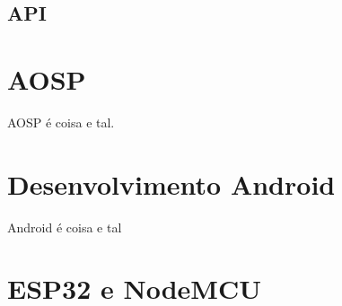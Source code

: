 \subsection{API}


\section{AOSP}

AOSP é coisa e tal.

\section{Desenvolvimento Android}

Android é coisa e tal 

\section{ESP32 e NodeMCU}